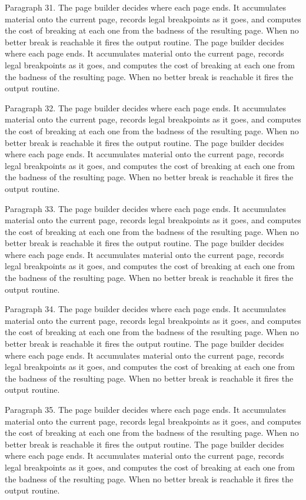 Paragraph 31. The page builder decides where each page ends. It accumulates material onto the current page, records legal breakpoints as it goes, and computes the cost of breaking at each one from the badness of the resulting page. When no better break is reachable it fires the output routine. The page builder decides where each page ends. It accumulates material onto the current page, records legal breakpoints as it goes, and computes the cost of breaking at each one from the badness of the resulting page. When no better break is reachable it fires the output routine. 

Paragraph 32. The page builder decides where each page ends. It accumulates material onto the current page, records legal breakpoints as it goes, and computes the cost of breaking at each one from the badness of the resulting page. When no better break is reachable it fires the output routine. The page builder decides where each page ends. It accumulates material onto the current page, records legal breakpoints as it goes, and computes the cost of breaking at each one from the badness of the resulting page. When no better break is reachable it fires the output routine. 

Paragraph 33. The page builder decides where each page ends. It accumulates material onto the current page, records legal breakpoints as it goes, and computes the cost of breaking at each one from the badness of the resulting page. When no better break is reachable it fires the output routine. The page builder decides where each page ends. It accumulates material onto the current page, records legal breakpoints as it goes, and computes the cost of breaking at each one from the badness of the resulting page. When no better break is reachable it fires the output routine. 

Paragraph 34. The page builder decides where each page ends. It accumulates material onto the current page, records legal breakpoints as it goes, and computes the cost of breaking at each one from the badness of the resulting page. When no better break is reachable it fires the output routine. The page builder decides where each page ends. It accumulates material onto the current page, records legal breakpoints as it goes, and computes the cost of breaking at each one from the badness of the resulting page. When no better break is reachable it fires the output routine. 

Paragraph 35. The page builder decides where each page ends. It accumulates material onto the current page, records legal breakpoints as it goes, and computes the cost of breaking at each one from the badness of the resulting page. When no better break is reachable it fires the output routine. The page builder decides where each page ends. It accumulates material onto the current page, records legal breakpoints as it goes, and computes the cost of breaking at each one from the badness of the resulting page. When no better break is reachable it fires the output routine. 

